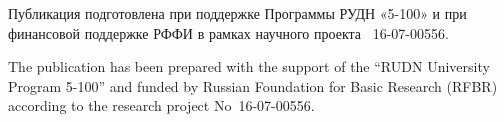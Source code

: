 \begin{Russian}
\def\acknowledgmentsname{Благодарности}
\end{Russian}

\begin{acknowledgments}


\begin{Russian}
Публикация подготовлена при поддержке Программы РУДН «5-100»
и при финансовой поддержке РФФИ в рамках научного проекта
\textnumero~16-07-00556.
%
\end{Russian}
\begin{English}
The publication has been prepared with the support of the ``RUDN University Program 5-100'' 
and funded by Russian Foundation for Basic Research (RFBR) according to the research project 
No~16-07-00556.
%
\end{English}

\end{acknowledgments}


